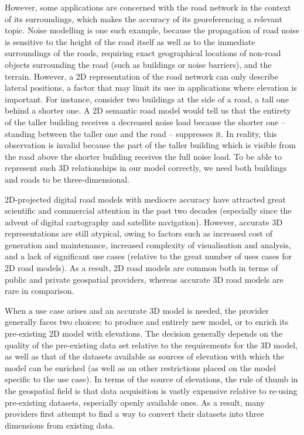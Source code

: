 However, some applications are concerned with the road network in the context of its surroundings, which makes the accuracy of its georeferencing a relevant topic. Noise modelling is one such example, because the propagation of road noise is sensitive to the height of the road itself as well as to the immediate surroundings of the roads, requiring exact geographical locations of non-road objects surrounding the road (such as buildings or noise barriers), and the terrain. However, a 2D representation of the road network can only describe lateral positions, a factor that may limit its use in applications where elevation is important. For instance, consider two buildings at the side of a road, a tall one behind a shorter one. A 2D semantic road model would tell us that the entirety of the taller building receives a decreased noise load because the shorter one – standing between the taller one and the road – suppresses it. In reality, this observation is invalid because the part of the taller building which is visible from the road above the shorter building receives the full noise load. To be able to represent such 3D relationships in our model correctly, we need both buildings and roads to be three-dimensional.

2D-projected digital road models with mediocre accuracy have attracted great scientific and commercial attention in the past two decades (especially since the advent of digital cartography and satellite navigation). However, accurate 3D representations are still atypical, owing to factors such as increased cost of generation and maintenance, increased complexity of visualisation and analysis, and a lack of significant use cases (relative to the great number of uses cases for 2D road models). As a result, 2D road models are common both in terms of public and private geospatial providers, whereas accurate 3D road models are rare in comparison.

When a use case arises and an accurate 3D model is needed, the provider generally faces two choices: to produce and entirely new model, or to enrich its pre-existing 2D model with elevations. The decision generally depends on the quality of the pre-existing data set relative to the requirements for the 3D model, as well as that of the datasets available as sources of elevation with which the model can be enriched (as well as an other restrictions placed on the model specific to the use case). In terms of the source of elevations, the rule of thumb in the geospatial field is that data acquisition is vastly expensive relative to re-using pre-existing datasets, especially openly available ones. As a result, many providers first attempt to find a way to convert their datasets into three dimensions from existing data.

